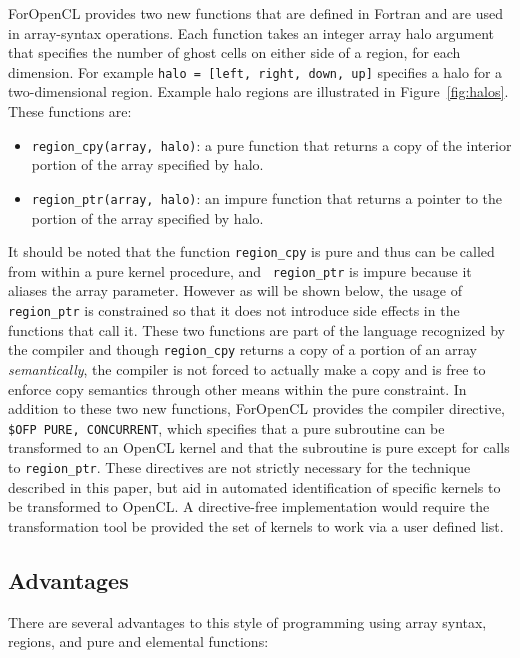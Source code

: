 ForOpenCL provides two new functions that are defined in Fortran and are used
in array-syntax operations.  Each function takes an integer array halo argument
that specifies the number of ghost cells on either side of a region, for each
dimension.  For example {\tt halo = [left, right, down, up]} specifies a halo
for a two-dimensional region.  Example halo regions are illustrated in
Figure~\ref{fig:halos}.  These functions are:

\begin{itemize}

\item {\tt region\_cpy(array, halo)}: a pure function that returns a copy of
  the interior portion of the array specified by halo.

\item {\tt region\_ptr(array, halo)}: an impure function that returns a pointer 
  to the portion of the array specified by halo.

\end{itemize}

It should be noted that the function {\tt region\_cpy} is pure and
thus can be called from within a pure kernel procedure, and {\tt
  region\_ptr} is impure because it aliases the array parameter.
However as will be shown below, the usage of {\tt region\_ptr} is
constrained so that it does not introduce side effects in the
functions that call it.  These two functions are part of the language
recognized by the compiler and though {\tt region\_cpy} returns a copy
of a portion of an array \emph{semantically}, the compiler is not
forced to actually make a copy and is free to enforce copy semantics
through other means within the pure constraint.  In addition to these
two new functions, ForOpenCL provides the compiler directive, {\tt
  \!\$OFP PURE, CONCURRENT}, which specifies that a pure subroutine can be
transformed to an OpenCL kernel and that the subroutine is pure except
for calls to {\tt region\_ptr}.  These directives are not strictly
necessary for the technique described in this paper, but aid in
automated identification of specific kernels to be transformed to
OpenCL.  A directive-free implementation would require the
transformation tool be provided the set of kernels to work via a user
defined list.

\subsection{Advantages}

There are several advantages to this style of programming using array
syntax, regions, and pure and elemental functions:

